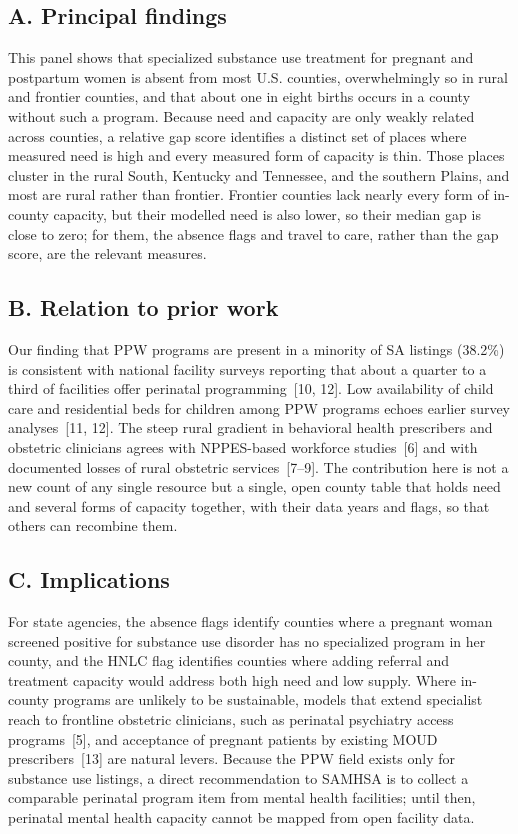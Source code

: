 \documentclass{article}
\begin{document}
\subsection*{A. Principal findings}
This panel shows that specialized substance use treatment for pregnant and postpartum women is absent from most U.S. counties, overwhelmingly so in rural and frontier counties, and that about one in eight births occurs in a county without such a program. Because need and capacity are only weakly related across counties, a relative gap score identifies a distinct set of places where measured need is high and every measured form of capacity is thin. Those places cluster in the rural South, Kentucky and Tennessee, and the southern Plains, and most are rural rather than frontier. Frontier counties lack nearly every form of in-county capacity, but their modelled need is also lower, so their median gap is close to zero; for them, the absence flags and travel to care, rather than the gap score, are the relevant measures.

\subsection*{B. Relation to prior work}
Our finding that PPW programs are present in a minority of SA listings (38.2\%) is consistent with national facility surveys reporting that about a quarter to a third of facilities offer perinatal programming~[10, 12]. Low availability of child care and residential beds for children among PPW programs echoes earlier survey analyses~[11, 12]. The steep rural gradient in behavioral health prescribers and obstetric clinicians agrees with NPPES-based workforce studies~[6] and with documented losses of rural obstetric services~[7--9]. The contribution here is not a new count of any single resource but a single, open county table that holds need and several forms of capacity together, with their data years and flags, so that others can recombine them.

\subsection*{C. Implications}
For state agencies, the absence flags identify counties where a pregnant woman screened positive for substance use disorder has no specialized program in her county, and the HNLC flag identifies counties where adding referral and treatment capacity would address both high need and low supply. Where in-county programs are unlikely to be sustainable, models that extend specialist reach to frontline obstetric clinicians, such as perinatal psychiatry access programs~[5], and acceptance of pregnant patients by existing MOUD prescribers~[13] are natural levers. Because the PPW field exists only for substance use listings, a direct recommendation to SAMHSA is to collect a comparable perinatal program item from mental health facilities; until then, perinatal mental health capacity cannot be mapped from open facility data.
\end{document}
